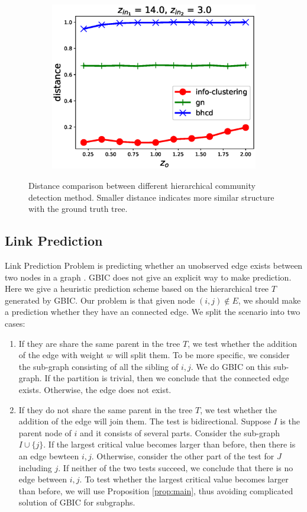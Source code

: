 \begin{figure}
\begin{subfigure}{0.33\textwidth}
		\includegraphics[width=\textwidth]{pic/z_o.eps}
		\caption{}
	\end{subfigure}
	\caption{Distance comparison between different hierarchical community detection method. Smaller distance indicates more similar structure with the ground truth tree.}\label{fig:cdr}	
\end{figure}
\subsection{Link Prediction}
Link Prediction Problem is predicting whether an unobserved edge exists between two nodes in a graph \citep{liben2007link}.  GBIC does not give an explicit way to make prediction. Here we give a heuristic prediction scheme based on the hierarchical tree $T$ generated by GBIC.
Our problem is that given node $(i,j) \not\in E$, we should make a prediction whether they have an connected edge. We split the scenario 
into two cases:
\begin{enumerate}
\item If they are share the same parent in the tree $T$, we test whether the addition of the edge with weight $w$ will split them. To be more specific, we consider the sub-graph consisting of all the sibling of $i,j$. We do GBIC on this sub-graph. If the partition is trivial, then we conclude that the connected edge exists. Otherwise, the edge does not exist.

\item If they do not share the same parent in the tree $T$, we test whether the addition of the edge will join them. The test is bidirectional. Suppose $I$ is the parent node of $i$ and it consists of several parts. Consider the sub-graph $I \cup \{j\}$. If the largest critical value becomes larger than before, then there is an edge bewteen $i,j$. Otherwise, consider the other part of the test for $J$ including $j$. If neither of the two tests succeed, we conclude that there is no edge between $i,j$. To test whether the largest critical value becomes larger than before, we will use Proposition \ref{prop:main},  thus avoiding complicated solution of GBIC for subgraphs.
\end{enumerate}


